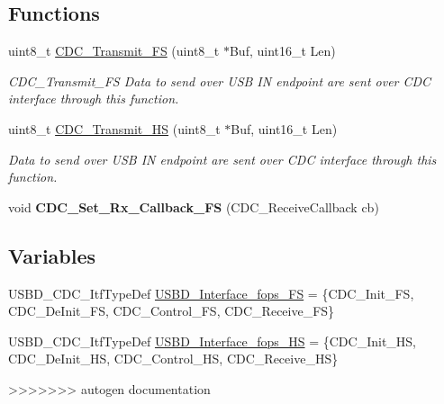 \subsection*{Functions}
\begin{DoxyCompactItemize}
\item 
uint8\+\_\+t \hyperlink{group___u_s_b_d___c_d_c___i_f_ga5137d6201dbdef2bf351c5b4941c24f4}{C\+D\+C\+\_\+\+Transmit\+\_\+\+FS} (uint8\+\_\+t $\ast$Buf, uint16\+\_\+t Len)
\begin{DoxyCompactList}\small\item\em C\+D\+C\+\_\+\+Transmit\+\_\+\+FS Data to send over U\+SB IN endpoint are sent over C\+DC interface through this function. \end{DoxyCompactList}\item 
uint8\+\_\+t \hyperlink{group___u_s_b_d___c_d_c___i_f_ga2e774589b6717992afd2b46280dabb8c}{C\+D\+C\+\_\+\+Transmit\+\_\+\+HS} (uint8\+\_\+t $\ast$Buf, uint16\+\_\+t Len)
\begin{DoxyCompactList}\small\item\em Data to send over U\+SB IN endpoint are sent over C\+DC interface through this function. \end{DoxyCompactList}\item 
\mbox{\label{group___u_s_b_d___c_d_c___i_f_ga6642b0cf9e8b7316a7fe2c3debc7efef}} 
void {\bfseries C\+D\+C\+\_\+\+Set\+\_\+\+Rx\+\_\+\+Callback\+\_\+\+FS} (C\+D\+C\+\_\+\+Receive\+Callback cb)
\end{DoxyCompactItemize}
\subsection*{Variables}
\begin{DoxyCompactItemize}
\item 
U\+S\+B\+D\+\_\+\+C\+D\+C\+\_\+\+Itf\+Type\+Def \hyperlink{group___u_s_b_d___c_d_c___i_f_ga99394ed19b774f171df96c2848c411ed}{U\+S\+B\+D\+\_\+\+Interface\+\_\+fops\+\_\+\+FS} = \{C\+D\+C\+\_\+\+Init\+\_\+\+FS, C\+D\+C\+\_\+\+De\+Init\+\_\+\+FS, C\+D\+C\+\_\+\+Control\+\_\+\+FS, C\+D\+C\+\_\+\+Receive\+\_\+\+FS\}
\item 
U\+S\+B\+D\+\_\+\+C\+D\+C\+\_\+\+Itf\+Type\+Def \hyperlink{group___u_s_b_d___c_d_c___i_f_ga54c4abfdfb31c4abdb087abdbbeb65d6}{U\+S\+B\+D\+\_\+\+Interface\+\_\+fops\+\_\+\+HS} = \{C\+D\+C\+\_\+\+Init\+\_\+\+HS, C\+D\+C\+\_\+\+De\+Init\+\_\+\+HS, C\+D\+C\+\_\+\+Control\+\_\+\+HS, C\+D\+C\+\_\+\+Receive\+\_\+\+HS\}
\end{DoxyCompactItemize}
>>>>>>> autogen documentation


